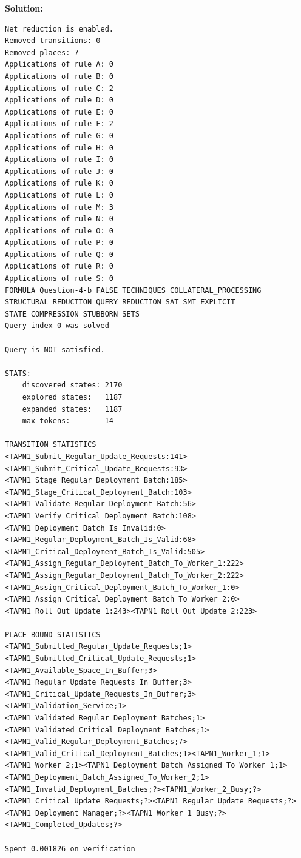 \documentclass[10pt]{article}
\newenvironment{solution}{
	\vspace{1em}\par\large\textbf{{Solution:}}\par\vspace{1em}
}{
	\vspace{1em}
}
\begin{document}
\begin{solution}
\begin{lstlisting}[style=queryoutput]
Net reduction is enabled.
Removed transitions: 0
Removed places: 7
Applications of rule A: 0
Applications of rule B: 0
Applications of rule C: 2
Applications of rule D: 0
Applications of rule E: 0
Applications of rule F: 2
Applications of rule G: 0
Applications of rule H: 0
Applications of rule I: 0
Applications of rule J: 0
Applications of rule K: 0
Applications of rule L: 0
Applications of rule M: 3
Applications of rule N: 0
Applications of rule O: 0
Applications of rule P: 0
Applications of rule Q: 0
Applications of rule R: 0
Applications of rule S: 0
FORMULA Question-4-b FALSE TECHNIQUES COLLATERAL_PROCESSING STRUCTURAL_REDUCTION QUERY_REDUCTION SAT_SMT EXPLICIT STATE_COMPRESSION STUBBORN_SETS 
Query index 0 was solved

Query is NOT satisfied.

STATS:
	discovered states: 2170
	explored states:   1187
	expanded states:   1187
	max tokens:        14

TRANSITION STATISTICS
<TAPN1_Submit_Regular_Update_Requests:141><TAPN1_Submit_Critical_Update_Requests:93><TAPN1_Stage_Regular_Deployment_Batch:185><TAPN1_Stage_Critical_Deployment_Batch:103><TAPN1_Validate_Regular_Deployment_Batch:56><TAPN1_Verify_Critical_Deployment_Batch:108><TAPN1_Deployment_Batch_Is_Invalid:0><TAPN1_Regular_Deployment_Batch_Is_Valid:68><TAPN1_Critical_Deployment_Batch_Is_Valid:505><TAPN1_Assign_Regular_Deployment_Batch_To_Worker_1:222><TAPN1_Assign_Regular_Deployment_Batch_To_Worker_2:222><TAPN1_Assign_Critical_Deployment_Batch_To_Worker_1:0><TAPN1_Assign_Critical_Deployment_Batch_To_Worker_2:0><TAPN1_Roll_Out_Update_1:243><TAPN1_Roll_Out_Update_2:223>

PLACE-BOUND STATISTICS
<TAPN1_Submitted_Regular_Update_Requests;1><TAPN1_Submitted_Critical_Update_Requests;1><TAPN1_Available_Space_In_Buffer;3><TAPN1_Regular_Update_Requests_In_Buffer;3><TAPN1_Critical_Update_Requests_In_Buffer;3><TAPN1_Validation_Service;1><TAPN1_Validated_Regular_Deployment_Batches;1><TAPN1_Validated_Critical_Deployment_Batches;1><TAPN1_Valid_Regular_Deployment_Batches;7><TAPN1_Valid_Critical_Deployment_Batches;1><TAPN1_Worker_1;1><TAPN1_Worker_2;1><TAPN1_Deployment_Batch_Assigned_To_Worker_1;1><TAPN1_Deployment_Batch_Assigned_To_Worker_2;1><TAPN1_Invalid_Deployment_Batches;?><TAPN1_Worker_2_Busy;?><TAPN1_Critical_Update_Requests;?><TAPN1_Regular_Update_Requests;?><TAPN1_Deployment_Manager;?><TAPN1_Worker_1_Busy;?><TAPN1_Completed_Updates;?>

Spent 0.001826 on verification


	\end{lstlisting}


\end{solution}
\end{document}
